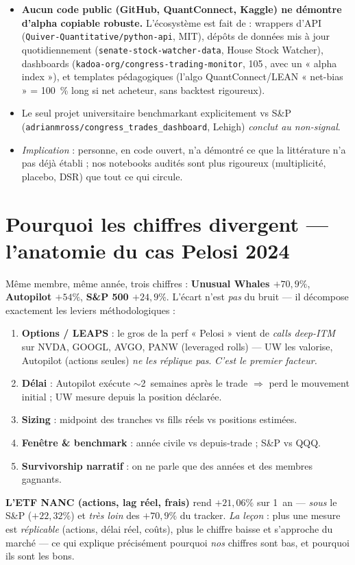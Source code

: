 \documentclass[11pt,a4paper]{article}
\newcommand{\code}[1]{\texttt{\small #1}}
\begin{document}
\begin{itemize}
  \item \textbf{Aucun code public (GitHub, QuantConnect, Kaggle) ne démontre d'alpha copiable robuste.}
  L'écosystème est fait de : wrappers d'API (\code{Quiver-Quantitative/python-api}, MIT), dépôts de données
  mis à jour quotidiennement (\code{senate-stock-watcher-data}, House Stock Watcher), dashboards
  (\code{kadoa-org/congress-trading-monitor}, 105\,\raisebox{0.1ex}{$\star$}, avec un « alpha index »), et
  templates pédagogiques (l'algo QuantConnect/LEAN « net-bias » = 100~\% long si net acheteur, sans backtest
  rigoureux).
  \item Le seul projet universitaire benchmarkant explicitement vs S\&P (\code{adrianmross/congress\_trades\_dashboard},
  Lehigh) \emph{conclut au non-signal}.
  \item \emph{Implication} : personne, en code ouvert, n'a démontré ce que la littérature n'a pas déjà établi ;
  nos notebooks audités sont plus rigoureux (multiplicité, placebo, DSR) que tout ce qui circule.
\end{itemize}

\section{Pourquoi les chiffres divergent --- l'anatomie du cas Pelosi 2024}

Même membre, même année, trois chiffres : \textbf{Unusual Whales $+70{,}9\%$}, \textbf{Autopilot $+54\%$},
\textbf{S\&P 500 $+24{,}9\%$}. L'écart n'est \emph{pas} du bruit --- il décompose exactement les leviers
méthodologiques :
\begin{enumerate}[leftmargin=1.6em]
  \item \textbf{Options / LEAPS} : le gros de la perf « Pelosi » vient de \emph{calls deep-ITM} sur NVDA,
  GOOGL, AVGO, PANW (leveraged rolls) --- UW les valorise, Autopilot (actions seules) \emph{ne les réplique
  pas}. \emph{C'est le premier facteur.}
  \item \textbf{Délai} : Autopilot exécute $\sim$2~semaines après le trade $\Rightarrow$ perd le mouvement
  initial ; UW mesure depuis la position déclarée.
  \item \textbf{Sizing} : midpoint des tranches vs fills réels vs positions estimées.
  \item \textbf{Fenêtre \& benchmark} : année civile vs depuis-trade ; S\&P vs QQQ.
  \item \textbf{Survivorship narratif} : on ne parle que des années et des membres gagnants.
\end{enumerate}
\textbf{L'ETF NANC (actions, lag réel, frais)} rend $+21{,}06\%$ sur 1~an --- \emph{sous} le S\&P
($+22{,}32\%$) et \emph{très loin} des $+70{,}9\%$ du tracker. \emph{La leçon} : plus une mesure est
\emph{réplicable} (actions, délai réel, coûts), plus le chiffre baisse et s'approche du marché --- ce qui
explique précisément pourquoi \emph{nos} chiffres sont bas, et pourquoi ils sont les bons.
\end{document}
